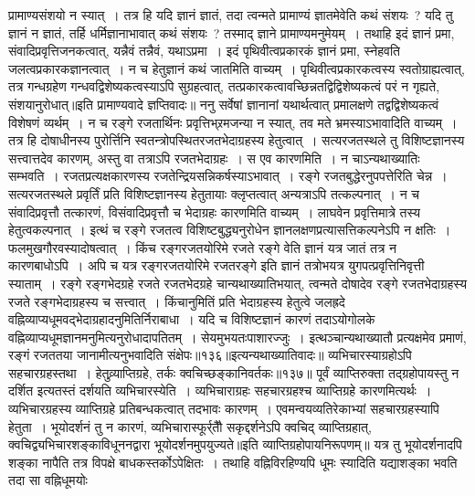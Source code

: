 प्रामाण्यसंशयो न स्यात्~। तत्र हि यदि ज्ञानं ज्ञातं, तदा त्वन्मते प्रामाण्यं ज्ञातमेवेति कथं संशयः~? यदि तु ज्ञानं न ज्ञातं, तर्हि धर्मिज्ञानाभावात् कथं संशयः~? तस्माद् ज्ञाने
प्रामाण्यमनुमेयम्~। तथाहि इदं ज्ञानं प्रमा, संवादिप्रवृत्तिजनकत्वात्, यन्नैवं तन्नैवं, यथाऽप्रमा~। इदं पृथिवीत्वप्रकारकं ज्ञानं प्रमा, स्नेहवति जलत्वप्रकारकज्ञानत्वात्~। न च
हेतुज्ञानं कथं जातमिति वाच्यम्~। पृथिवीत्वप्रकारकत्वस्य स्वतोग्राह्यत्वात्, तत्र गन्धग्रहेण गन्धवद्विशेष्यकत्वस्याऽपि सुग्रहत्वात्, तत्प्रकारकत्वावच्छिन्नतद्विद्विशेष्यकत्वं परं
न गृह्यते, संशयानुरोधात्॥इति प्रामाण्यवादे ज्ञप्तिवादः॥
ननु सर्वेषां ज्ञानानां यथार्थत्वात् प्रमालक्षणे तद्वद्विशेष्यकत्वं विशेषणं व्यर्थम्~। न च रङ्गे रजतार्थिनः प्रवृत्तिभ्र्रमजन्या न स्यात्, तव मते भ्रमस्याऽभावादिति
वाच्यम्~। तत्र हि दोषाधीनस्य पुरोर्त्तिनि स्वतन्त्रोपस्थितरजतभेदाग्रहस्य हेतुत्वात्~। सत्यरजतस्थले तु विशिष्टज्ञानस्य सत्त्वात्तदेव कारणम्, अस्तु वा तत्राऽपि रजतभेदाग्रहः~।
स एव कारणमिति~। न चाऽन्यथाख्यातिः सम्भवति~। रजतप्रत्यक्षकारणस्य रजतेन्द्रियसन्निकर्षस्याऽभावात्~। रङ्गे रजतबुद्धेरनुपपत्तेरिति चेन्न~। सत्यरजतस्थले प्रवृर्तिं प्रति
विशिष्टज्ञानस्य हेतुतायाः क्लृप्तत्वात् अन्यत्राऽपि तत्कल्पनात्~। न च संवादिप्रवृत्तौ तत्कारणं, विसंवादिप्रवृत्तौ च भेदाग्रहः कारणमिति वाच्यम्~। लाघवेन प्रवृत्तिमात्रे
तस्य हेतुत्वकल्पनात्~। इत्थं च रङ्गे रजतत्व विशिष्टबुद्ध्यनुरोधेन ज्ञानलक्षणप्रत्यासत्तिकल्पनेऽपि न क्षतिः~। फलमुखगौरवस्यादोषत्वात्~। किंच रङ्गरजतयोरिमे रजते
रङ्गे वेति ज्ञानं यत्र जातं तत्र न कारणबाधोऽपि~। अपि च यत्र रङ्गरजतयोरिमे रजतरङ्गे इति ज्ञानं तत्रोभयत्र युगपत्प्रवृत्तिनिवृत्ती स्याताम्~। रङ्गे रङ्गभेदग्रहे रजते
रजतभेदग्रहे चान्यथाख्यातिभयात्, त्वन्मते दोषादेव रङ्गे रजतभेदाग्रहस्य रजते रङ्गभेदाग्रहस्य च सत्त्वात्~। किंचानुमितिं प्रति भेदाग्रहस्य हेतुत्वे जलह्रदे
वह्निव्याप्यधूमवद्भेदाग्रहादनुमितिर्निराबाधा~। यदि च विशिष्टज्ञानं कारणं तदाऽयोगोलके वह्निव्याप्यधूमज्ञानमनुमित्यनुरोधादापतितम्~। सेयमुभयतःपाशारज्जुः~। इत्थञ्चान्यथाख्यातौ
प्रत्यक्षमेव प्रमाणं, रङ्गं रजततया जानामीत्यनुभवादिति संक्षेपः॥१३६॥इत्यन्यथाख्यातिवादः॥
व्यभिचारस्याग्रहोऽपि सहचारग्रहस्तथा~।
हेतुव्र्याप्तिग्रहे, तर्कः क्वचिच्छङ्कानिवर्तकः॥१३७॥
पूर्वं व्याप्तिरुक्ता तद्ग्रहोपायस्तु न दर्शित इत्यतस्तं दर्शयति व्यभिचारस्येति~। व्यभिचाराग्रहः सहचारग्रहश्च व्याप्तिग्रहे कारणमित्यर्थः~। व्यभिचारग्रहस्य व्याप्तिग्रहे
प्रतिबन्धकत्वात् तदभावः कारणम्~। एवमन्वयव्यतिरेकाभ्यां सहचारग्रहस्यापि हेतुता~। भूयोदर्शनं तु न कारणं, व्यभिचारास्फूर्र्तौै सकृद्दर्शनेऽपि क्वचिद् व्याप्तिग्रहात्,
क्वचिद्व्यभिचारशङ्काविधूननद्वारा भूयोदर्शनमुपयुज्यते॥इति व्याप्तिग्रहोपायनिरूपणम्॥
यत्र तु भूयोदर्शनादपि शङ्का नापैति तत्र विपक्षे बाधकस्तर्कोऽपेक्षितः~। तथाहि वह्निविरहिण्यपि धूमः स्यादिति यद्याशङ्का भवति तदा सा वह्निधूमयोः
